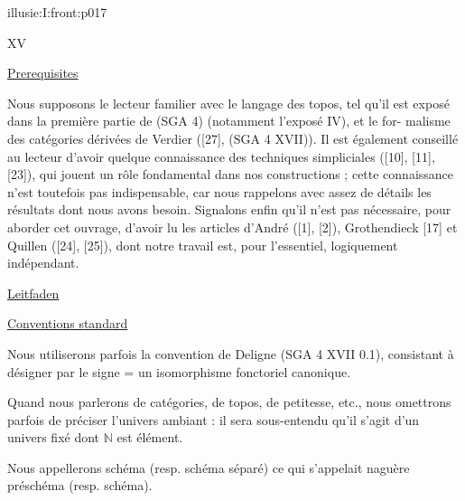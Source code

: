 \IllusieSetPhysicalPageSize{450.6bp}{704bp}
\begin{illusiefrontpage}{illusie:I:front:p017}{}
\begin{center}\fontsize{10}{12}\selectfont XV\end{center}
\vspace{8bp}
\hypertarget{illusie:I:prereq}{}%
\underline{Prerequisites}

\vspace{6bp}
\hypertarget{illusie:I:prereq:p1}{}%
\hspace*{22bp}Nous supposons le lecteur familier avec le langage des topos, tel qu'il est
exposé dans la première partie de (SGA 4) (notamment l'exposé IV), et le for-\linebreak
malisme des catégories dérivées de Verdier ([27], (SGA 4 XVII)). Il est également
conseillé au lecteur d'avoir quelque connaissance des techniques simpliciales
([10], [11], [23]), qui jouent un rôle fondamental dans nos constructions ; cette
connaissance n'est toutefois pas indispensable, car nous rappelons avec assez de
détails les résultats dont nous avons besoin. Signalons enfin qu'il n'est pas
nécessaire, pour aborder cet ouvrage, d'avoir lu les articles d'André ([1], [2]),
Grothendieck [17] et Quillen ([24], [25]), dont notre travail est, pour l'essentiel,
logiquement indépendant.

\vspace{8bp}
\hypertarget{illusie:I:prereq:guide}{}%
\underline{Leitfaden}

\vspace{2bp}
\hypertarget{illusie:I:prereq:guide:d1}{}%
\begin{center}\IllusieChapterGuide\end{center}

\vspace{2bp}
\hypertarget{illusie:I:conv}{}%
\underline{Conventions standard}

\vspace{6bp}
\hypertarget{illusie:I:conv:p1}{}%
\hspace*{22bp}Nous utiliserons parfois la convention de Deligne (SGA 4 XVII 0.1),
consistant à désigner par le signe \textquotedbl{} = \textquotedbl{} un
isomorphisme fonctoriel canonique.

\vspace{4bp}
\hypertarget{illusie:I:conv:p2}{}%
\hspace*{22bp}Quand nous parlerons de catégories, de topos, de
\textquotedbl{}petitesse\textquotedbl{}, etc., nous omettrons parfois de préciser
l'univers ambiant : il sera sous-entendu qu'il s'agit d'un univers fixé dont
$\mathbb{N}$ est élément.

\vspace{4bp}
\hypertarget{illusie:I:conv:p3}{}%
\hspace*{22bp}Nous appellerons schéma (resp. schéma séparé) ce qui s'appelait naguère
préschéma (resp. schéma).
\end{illusiefrontpage}
